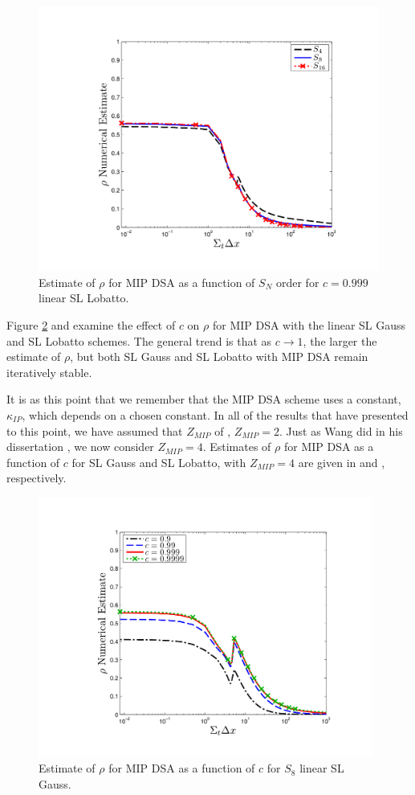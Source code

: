 \begin{figure}[!htp]
\centering
\includegraphics[width=12cm]{chapter4_acceleration/Const_2_Constant_XS_sn_comparions_MIP_Lobatto.pdf}
\caption{Estimate of $\rho$ for MIP DSA as a function of  $S_N$ order for $c=0.999$ linear SL Lobatto.}
\label{fig:mip_lobatto_as_fun_sn}
\end{figure}


Figure \ref{fig:mip_gauss_as_fun_c} and  examine the effect of $c$ on $\rho$ for MIP DSA with the linear SL Gauss and SL Lobatto schemes.
The general trend is that as $c\to 1$, the larger the estimate of $\rho$, but both SL Gauss and SL Lobatto with MIP DSA remain iteratively stable.

It is as this point that we remember that the MIP DSA scheme uses a constant, $\kappa_{IP}$, which depends on a chosen constant.  In all of the results that have presented to this point, we have assumed that $Z_{MIP}$ of , $Z_{MIP} =2$.
Just as Wang did in his dissertation \cite{yaqi_dissertation}, we now consider $Z_{MIP}=4$.  
Estimates of $\rho$ for MIP DSA as a function of $c$ for SL Gauss and SL Lobatto, with $Z_{MIP}=4$ are given in  and , respectively.
\begin{figure}[!htp]
\centering
\includegraphics[width=11cm]{chapter4_acceleration/Const_2_Constant_XS_c_comparions_MIP_Gauss.pdf}
\caption{Estimate of $\rho$ for MIP DSA as a function of $c$  for  $S_8$  linear SL Gauss.}
\label{fig:mip_gauss_as_fun_c}
\end{figure}

